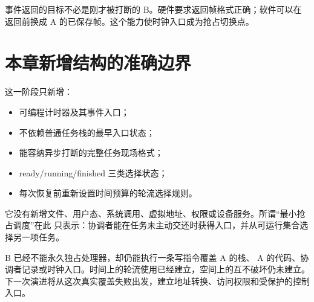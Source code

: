 事件返回的目标不必是刚才被打断的 B。硬件要求返回帧格式正确；软件可以在返回前换成 A
的已保存帧。这个能力使时钟入口成为抢占切换点。

\section{本章新增结构的准确边界}

这一阶段只新增：

\begin{itemize}
\item 可编程计时器及其事件入口；
\item 不依赖普通任务栈的最早入口状态；
\item 能容纳异步打断的完整任务现场格式；
\item ready/running/finished 三类选择状态；
\item 每次恢复前重新设置时间预算的轮流选择规则。
\end{itemize}

它没有新增文件、用户态、系统调用、虚拟地址、权限或设备服务。所谓“最小抢占调度”在此
只表示：协调者能在任务未主动交还时获得入口，并从可运行集合选择另一项任务。

B 已经不能永久独占处理器，却仍能执行一条写指令覆盖 A 的栈、
A 的代码、协调者记录或时钟入口。时间上的轮流使用已经建立，空间上的互不破坏仍未建立。
下一次演进将从这次真实覆盖失败出发，建立地址转换、访问权限和受保护的控制入口。
